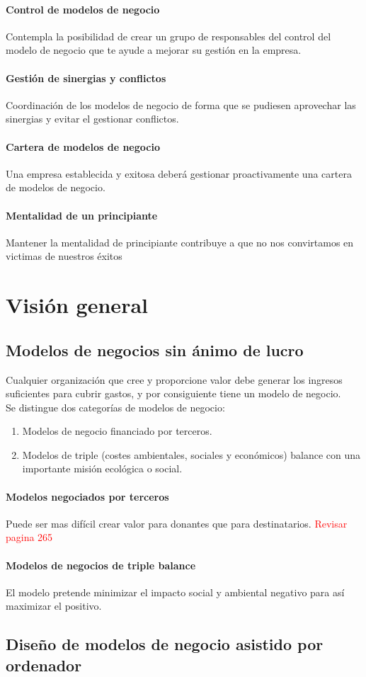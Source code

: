 \documentclass[11pt]{book}
\begin{document}
\subsubsection{Control de modelos de negocio}
Contempla la posibilidad de crear un grupo de responsables del control del modelo de negocio que te ayude a mejorar su gestión en la empresa. 
\subsubsection{Gestión de sinergias y conflictos}
Coordinación de los modelos de negocio de forma que se pudiesen aprovechar las sinergias y evitar el gestionar conflictos.
\subsubsection{Cartera de modelos de negocio}
Una empresa establecida y exitosa deberá gestionar proactivamente una cartera de modelos de negocio.
\subsubsection{Mentalidad de un principiante}
Mantener la mentalidad de principiante contribuye a que no nos convirtamos en victimas de nuestros éxitos
\chapter{Visión general}
\section{Modelos de negocios sin ánimo de lucro}
Cualquier organización que cree y proporcione valor debe generar los ingresos suficientes para cubrir gastos, y por consiguiente tiene un modelo de negocio.\\
Se distingue dos categorías de modelos de negocio:
\begin{enumerate}
\item Modelos de negocio financiado por terceros.
\item Modelos de triple (costes ambientales, sociales y económicos) balance con una importante misión ecológica o social.
\end{enumerate}
\subsubsection{Modelos negociados por terceros}
Puede ser mas difícil crear valor para donantes que para destinatarios. \textcolor{red}{Revisar pagina 265}
\subsubsection{Modelos de negocios de triple balance}

El modelo pretende minimizar el impacto social y ambiental negativo para así maximizar el positivo.
\section{Diseño de modelos de negocio asistido por ordenador}
\end{document}
